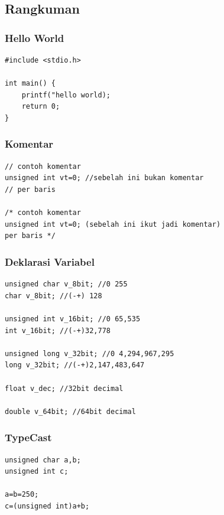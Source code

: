 \documentclass[12pt,]{article}
\begin{document}
	\newpage
	\subsection{Rangkuman}
	
	\subsubsection{Hello World}
	\begin{verbatim}
#include <stdio.h>

int main() {
	printf("hello world);
	return 0;
}
	\end{verbatim}
	
	\subsubsection{Komentar}
	\begin{verbatim}
// contoh komentar
unsigned int vt=0; //sebelah ini bukan komentar
// per baris

/* contoh komentar
unsigned int vt=0; (sebelah ini ikut jadi komentar)
per baris */
	\end{verbatim}
	
	\subsubsection{Deklarasi Variabel}
	\begin{verbatim}
unsigned char v_8bit; //0 255
char v_8bit; //(-+) 128

unsigned int v_16bit; //0 65,535
int v_16bit; //(-+)32,778

unsigned long v_32bit; //0 4,294,967,295
long v_32bit; //(-+)2,147,483,647

float v_dec; //32bit decimal

double v_64bit; //64bit decimal
	\end{verbatim}
	
	\subsubsection{TypeCast}
	\begin{verbatim}
unsigned char a,b;
unsigned int c;

a=b=250;
c=(unsigned int)a+b;
	\end{verbatim}
	
\end{document}
